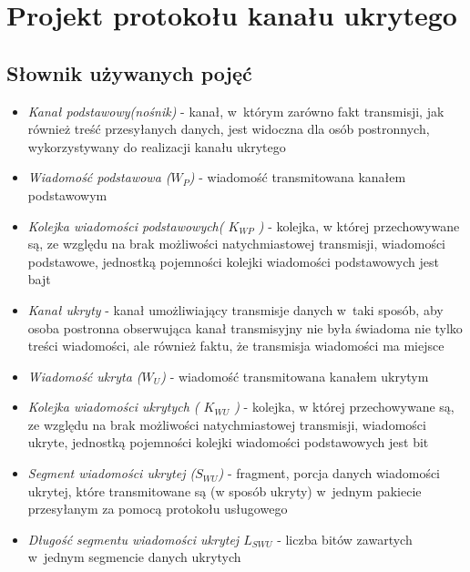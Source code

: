 \documentclass[a4paper, twoside, 12pt]{report}
\begin{document}
\chapter{Projekt protokołu kanału ukrytego}
    \section{Słownik używanych pojęć} \label{DICT}
    \begin{itemize}
        \item \emph{Kanał podstawowy(nośnik)} - kanał, w~którym zarówno fakt transmisji,
            jak również treść przesyłanych danych, jest widoczna dla osób postronnych,
            wykorzystywany do realizacji kanału ukrytego

        \item \emph{Wiadomość podstawowa (\(W_P\))} - wiadomość transmitowana kanałem
            podstawowym

        \item \emph{Kolejka wiadomości podstawowych( \( K_{WP} \) )} - kolejka, w
                której przechowywane są, ze względu na brak możliwości natychmiastowej
                transmisji, wiadomości podstawowe, jednostką pojemności kolejki
                wiadomości podstawowych jest bajt

        \item \emph{Kanał ukryty} - kanał umożliwiający transmisje danych w~taki sposób,
            aby osoba postronna obserwująca kanał transmisyjny nie była świadoma
            nie tylko treści wiadomości, ale również faktu, że transmisja wiadomości ma miejsce

        \item \emph{Wiadomość ukryta (\(W_U\))} - wiadomość transmitowana kanałem ukrytym

        \item \emph{Kolejka wiadomości ukrytych ( \( K_{WU} \) )} - kolejka, w
                której przechowywane są, ze względu na brak możliwości natychmiastowej
                transmisji, wiadomości ukryte, jednostką pojemności kolejki
                wiadomości podstawowych jest bit

        \item \emph{Segment wiadomości ukrytej (\(S_{WU}\))} - fragment, porcja danych
            wiadomości ukrytej, które transmitowane są (w sposób ukryty) w~jednym
            pakiecie przesyłanym za pomocą protokołu usługowego

        \item \emph{Długość segmentu wiadomości ukrytej \( L_{SWU} \)} - liczba
                bitów zawartych w~jednym segmencie danych ukrytych


\end{itemize}
\end{document}
